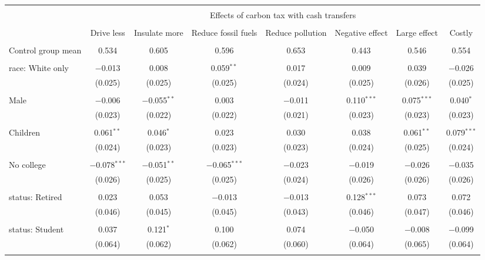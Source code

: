 
\begin{tabular}{@{\extracolsep{5pt}}lccccccc} 
\\[-1.8ex]\hline 
\hline \\[-1.8ex] 
 & \multicolumn{7}{c}{Effects of carbon tax with cash transfers} \\ 
\cline{2-8} 
\\[-1.8ex] & Drive less & Insulate more & Reduce fossil fuels & Reduce pollution & Negative effect & Large effect & Costly \\ 
\hline \\[-1.8ex] 
 Control group mean & 0.534 & 0.605 & 0.596 & 0.653 & 0.443 & 0.546 & 0.554  \\ \hline \\[-1.8ex] race: White only & $-$0.013 & 0.008 & 0.059$^{**}$ & 0.017 & 0.009 & 0.039 & $-$0.026 \\ 
  & (0.025) & (0.025) & (0.025) & (0.024) & (0.025) & (0.026) & (0.025) \\ 
  & & & & & & & \\ 
 Male & $-$0.006 & $-$0.055$^{**}$ & 0.003 & $-$0.011 & 0.110$^{***}$ & 0.075$^{***}$ & 0.040$^{*}$ \\ 
  & (0.023) & (0.022) & (0.022) & (0.021) & (0.023) & (0.023) & (0.023) \\ 
  & & & & & & & \\ 
 Children & 0.061$^{**}$ & 0.046$^{*}$ & 0.023 & 0.030 & 0.038 & 0.061$^{**}$ & 0.079$^{***}$ \\ 
  & (0.024) & (0.023) & (0.023) & (0.023) & (0.024) & (0.025) & (0.024) \\ 
  & & & & & & & \\ 
 No college & $-$0.078$^{***}$ & $-$0.051$^{**}$ & $-$0.065$^{***}$ & $-$0.023 & $-$0.019 & $-$0.026 & $-$0.035 \\ 
  & (0.026) & (0.025) & (0.025) & (0.024) & (0.026) & (0.026) & (0.026) \\ 
  & & & & & & & \\ 
 status: Retired & 0.023 & 0.053 & $-$0.013 & $-$0.013 & 0.128$^{***}$ & 0.073 & 0.072 \\ 
  & (0.046) & (0.045) & (0.045) & (0.043) & (0.046) & (0.047) & (0.046) \\ 
  & & & & & & & \\ 
 status: Student & 0.037 & 0.121$^{*}$ & 0.100 & 0.074 & $-$0.050 & $-$0.008 & $-$0.099 \\ 
  & (0.064) & (0.062) & (0.062) & (0.060) & (0.064) & (0.065) & (0.064) \\ 
  & & & & & & & \\ 

\end{tabular}
